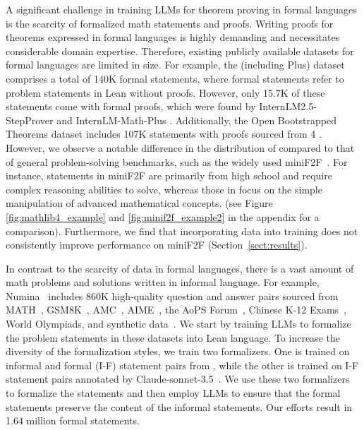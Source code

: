 A significant challenge in training LLMs for theorem proving in formal languages is the scarcity of formalized math statements and proofs. Writing proofs for theorems expressed in formal languages is highly demanding and necessitates considerable domain expertise. Therefore, existing publicly available datasets for formal languages are limited in size. For example, the \lwb{} (including \lwb{} Plus) dataset \citep{ying2024lean, wu2024internlm2} comprises a total of 140K formal statements, where formal statements refer to problem statements in Lean without proofs.
However, only 15.7K of these statements come with formal proofs, which were found by InternLM2.5-StepProver and InternLM-Math-Plus \citep{ying2024lean, wu2024internlm2, ying2024internlm}. 
Additionally, the Open Bootstrapped Theorems dataset \citep{wang2024theoremllama} includes 107K statements with proofs sourced from \mathlib{}4 \citep{mathlib4}. 
However, we observe a notable difference in the distribution of \mathlib{} compared to that of general problem-solving benchmarks, such as the widely used miniF2F~\citep{zheng2021minif2f}. 
For instance, statements in miniF2F are primarily from high school and require complex reasoning abilities to solve, whereas those in \mathlib{} focus on the simple manipulation of advanced mathematical concepts. (see Figure \ref{fig:mathlib4_example} and \ref{fig:minif2f_example2} in the appendix for a comparison).
Furthermore, we find that incorporating \mathlib{} data into training does not consistently improve performance on miniF2F (Section~\ref{sect:results}).


In contrast to the scarcity of data in formal languages, there is a vast amount of math problems and solutions written in informal language. For example, Numina~\citep{li2024numinamath} includes 860K high-quality question and answer pairs sourced from MATH~\citep{hendrycks2021measuring}, GSM8K~\citep{cobbe2021training}, AMC~\citep{aops_wiki}, AIME~\citep{maa_aime_2024}, the AoPS Forum~\citep{aops_wiki}, Chinese K-12 Exams~\citep{shao2024deepseekmath}, World Olympiads, and synthetic data~\citep{mitra2024orca}. We start by training LLMs to formalize the problem statements in these datasets into Lean language.  To increase the diversity of the formalization styles, we train two formalizers. One is trained on informal and formal (I-F) statement pairs from \lwb{}, while the other is trained on I-F statement pairs annotated by Claude-sonnet-3.5~\citep{anthropic2024a}. We use these two formalizers to formalize the statements and then employ LLMs to ensure that the formal statements preserve the content of the informal statements.  Our efforts result in 1.64 million formal statements.

